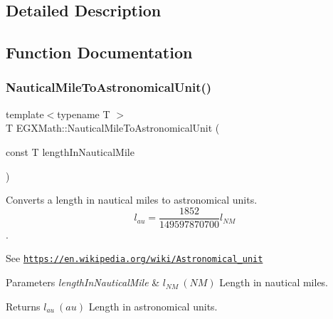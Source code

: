 \subsection{Detailed Description}


\subsection{Function Documentation}
\mbox{\label{group___e_g_x_math-_conversions-_length_conversions-_non-_s_i-_nautical_mile-_astronomical_ga637834e348d5ca8b121204dcff671e7d}} 
\subsubsection{\texorpdfstring{Nautical\+Mile\+To\+Astronomical\+Unit()}{NauticalMileToAstronomicalUnit()}}
{\footnotesize\ttfamily template$<$typename T $>$ \\
T E\+G\+X\+Math\+::\+Nautical\+Mile\+To\+Astronomical\+Unit (\begin{DoxyParamCaption}\item[{const T}]{length\+In\+Nautical\+Mile }\end{DoxyParamCaption})}



Converts a length in nautical miles to astronomical units. \[ l_{au}= \frac{1852}{149597870700} l_{NM} \]. 

See \href{https://en.wikipedia.org/wiki/Astronomical_unit}{\tt https\+://en.\+wikipedia.\+org/wiki/\+Astronomical\+\_\+unit} 
\begin{DoxyParams}{Parameters}
{\em length\+In\+Nautical\+Mile} & $ l_{NM}\ (NM)$ Length in nautical miles. \\
\hline
\end{DoxyParams}
\begin{DoxyReturn}{Returns}
$ l_{au}\ (au)$ Length in astronomical units. 
\end{DoxyReturn}
\mbox{\label{group___e_g_x_math-_conversions-_length_conversions-_non-_s_i-_nautical_mile-_astronomical_ga895ab2142f00d16718fa0297d076caa3}} 
